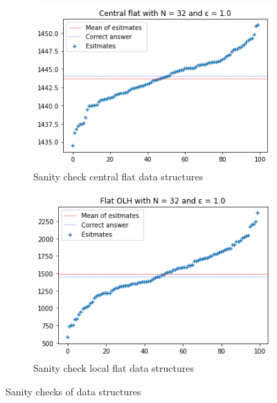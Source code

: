 \documentclass[11pt]{article}
\theoremstyle{definition}
\begin{document}
\begin{figure}
\begin{subfigure}{.5\textwidth}
  \centering
  \includegraphics[width=\linewidth]{figures/tests/cen_flat/index.png}
  \caption{Sanity check central flat data structures}
  \label{fig:test_c_flat}
\end{subfigure}%
\begin{subfigure}{.5\textwidth}
  \centering
  \includegraphics[width=\linewidth]{figures/tests/local_flat/index.png}
  \caption{Sanity check local flat data structures}
  \label{fig:test_l_flat}
\end{subfigure}%
\caption{Sanity checks of data structures}
\label{fig:flat_sainty}
\end{figure}
\end{document}

